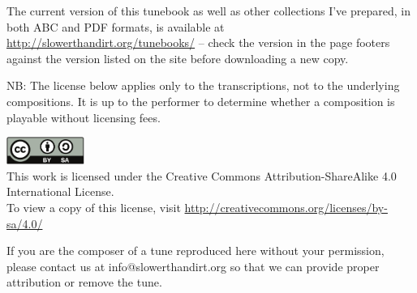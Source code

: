 \begin{titlepage}
\begin{center}
\begin{minipage}{6in}
The current version of this tunebook as well as other collections I've
prepared, in both ABC and PDF formats, is available at 
\url{http://slowerthandirt.org/tunebooks/} -- check the version in the page
footers against the version listed on the site before downloading a new
copy.

NB: The license below applies only to the transcriptions, not to the
underlying compositions. It is up to the performer to determine
whether a composition is playable without licensing fees.

\end{minipage}

\vfill


\includegraphics[width=1in]{../includes/cc-by-sa}\\
This work is licensed under the Creative Commons
Attribution-ShareAlike 4.0 International License.\\
To view a copy of this license, visit 
\url{http://creativecommons.org/licenses/by-sa/4.0/}
\end{center}
\end{titlepage}

\clearpage



\vfill

\noindent
If you are the composer of a tune reproduced here without your permission,
please contact us at info@slowerthandirt.org so that we can provide proper
attribution or remove the tune.

\cleardoublepage

